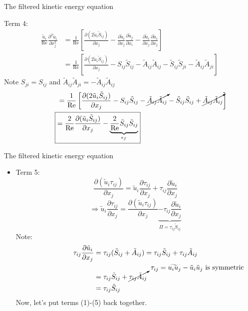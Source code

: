 
\begin{frame}{The filtered kinetic energy equation}

Term 4:
\begin{align*}
\frac{\tilde u_i}{\text{Re}} \frac{\partial^2 \tilde u_i}{\partial x_j^{2}} &= \frac{1}{\text{Re}}\left[\frac{\partial (2\tilde u_i \tilde S_{ij})}{\partial x_j} - \frac{\partial \tilde u_i}{\partial x_j}\frac{\partial \tilde u_j}{\partial x_i} - \frac{\partial \tilde u_i}{\partial x_j}\frac{\partial \tilde u_i}{\partial x_j}\right]\\
&= \frac{1}{\text{Re}}\left[\frac{\partial (2\tilde u_i \tilde S_{ij})}{\partial x_j} - S_{ij}\tilde S_{ij} - \tilde A_{ij}\tilde A_{ij} - \tilde S_{ij}\tilde S_{ji} - \tilde A_{ij}\tilde A_{ji}\right]
\end{align*}
Note $S_{ji} = S_{ij}$ and $\tilde A_{ij}\tilde A_{ji} = -\tilde A_{ij}\tilde A_{ij}$
\begin{align*}
\hphantom{\frac{\tilde u_i}{\text{Re}} \frac{\partial^2 \tilde u_i}{\partial x_j^{2}}}	&= \frac{1}{\text{Re}}\left[\frac{\partial (2\tilde u_i \tilde S_{ij})}{\partial x_j} - S_{ij}\tilde S_{ij} - \cancelto{}{\tilde A_{ij}\tilde A_{ij}} - \tilde S_{ij}\tilde S_{ij} + \cancelto{}{\tilde A_{ij}\tilde A_{ij}}\right]\\
\Aboxed{&= \frac{2}{\text{Re}}\frac{\partial (\tilde u_i \tilde S_{ij})}{\partial x_j} - \underbrace{\frac{2}{\text{Re}}\tilde S_{ij}\tilde S_{ij}}_{\epsilon_f}}
\end{align*}

\end{frame}


\begin{frame}{The filtered kinetic energy equation}

\begin{itemize}
\item Term 5:
$$\frac{\partial (\tilde u_i \tau_{ij})}{\partial x_j}  = \tilde u_i \frac{\partial \tau_{ij}}{\partial x_j} + \tau_{ij} \frac{\partial \tilde u_i}{\partial x_j}$$
$$\boxed{\Rightarrow \tilde u_i\frac{\partial \tau_{ij}}{\partial x_j} = \frac{\partial (\tilde u_i \tau_{ij})}{\partial x_j} \underbrace{-\tau_{ij} \frac{\partial \tilde u_i}{\partial x_j}}_{\Pi=\tau_{ij}\tilde S_{ij}}}$$
Note: 
\begin{align*}
\tau_{ij} \frac{\partial \tilde u_i}{\partial x_j} &= \tau_{ij}(\tilde S_{ij} + \tilde A_{ij})= \tau_{ij} \tilde S_{ij} + \tau_{ij} \tilde A_{ij}\\
&= \tau_{ij} \tilde S_{ij} + \cancelto{\tau_{ij} = \widetilde{u_iu_j} - \tilde u_i \tilde u_j \text{ is symmetric}}{\tau_{ij} \tilde A_{ij}}\\
&= \tau_{ij} \tilde S_{ij}
\end{align*}
Now, let's put terms (1)-(5) back together.
\end{itemize}
\end{frame}

